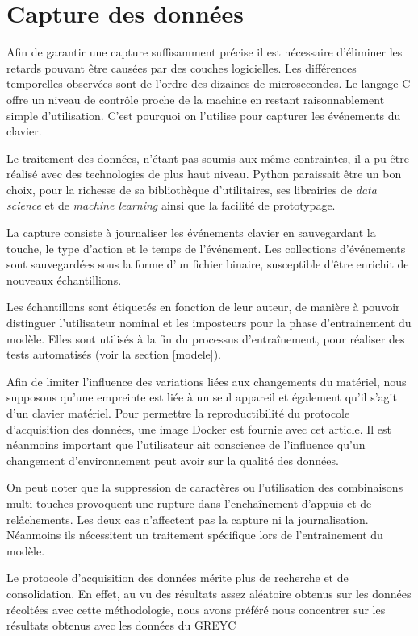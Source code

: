 \section{Capture des données}

Afin de garantir une capture suffisamment précise il est nécessaire d’éliminer les retards pouvant être causées par des couches logicielles. Les différences temporelles observées sont de l'ordre des dizaines de microsecondes. Le langage C offre un niveau de contrôle proche de la machine en restant raisonnablement simple d'utilisation. C'est pourquoi on l'utilise pour capturer les événements du clavier.

Le traitement des données, n’étant pas soumis aux même contraintes, il a pu être réalisé avec des technologies de plus haut niveau. Python paraissait être un bon choix, pour la richesse de sa bibliothèque d’utilitaires, ses librairies de \textit{data science} et de \textit{machine learning} ainsi que la facilité de prototypage.

La capture consiste à journaliser les événements clavier en sauvegardant la touche, le type d’action et le temps de l’événement. Les collections d’événements sont sauvegardées sous la forme d’un fichier binaire, susceptible d’être enrichit de nouveaux échantillions.

Les échantillons sont étiquetés en fonction de leur auteur, de manière à pouvoir distinguer l'utilisateur nominal et les imposteurs pour la phase d’entrainement du modèle. Elles sont utilisés à la fin du processus d’entraînement, pour réaliser des tests automatisés (voir la section \ref{modele}).

Afin de limiter l'influence des variations liées aux changements du matériel, nous supposons qu’une empreinte est liée à un seul appareil et également qu’il s’agit d’un clavier matériel. Pour permettre la reproductibilité du protocole d'acquisition des données, une image Docker est fournie avec cet article. Il est néanmoins important que l'utilisateur ait conscience de l'influence qu'un changement d'environnement peut avoir sur la qualité des données.

On peut noter que la suppression de caractères ou l'utilisation des combinaisons multi-touches provoquent une rupture dans l’enchaînement d’appuis et de relâchements. Les deux cas n'affectent pas la capture ni la journalisation. Néanmoins ils nécessitent un traitement spécifique lors de l'entrainement du modèle.

Le protocole d'acquisition des données mérite plus de recherche et de consolidation. En effet, au vu des résultats assez aléatoire obtenus sur les données récoltées avec cette méthodologie, nous avons préféré nous concentrer sur les résultats obtenus avec les données du GREYC
